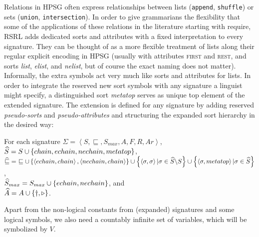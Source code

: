 \documentclass[output=paper
                ,modfonts
                ,nonflat
	        ,collection
	        ,collectionchapter
	        ,collectiontoclongg
 	        ,biblatex
                ,babelshorthands
                ,newtxmath
                ,draftmode
                ,colorlinks, citecolor=brown
]{./langsci/langscibook}
\begin{document}
{{Relations in HPSG often express relationships between
lists (\texttt{append}, \texttt{shuffle}) or sets (\texttt{union},
\texttt{intersection}). In order to give grammarians the flexibility
that some of the applications of these relations in the literature
starting with \citet{PollardSag1994} require, RSRL adds
dedicated sorts and attributes with a fixed interpretation to every signature.
They can be thought of as a more flexible treatment of lists along their
regular explicit encoding in HPSG (usually with attributes \textsc{first} and
\textsc{rest}, and sorts \textit{list}, \textit{elist}, and
\textit{nelist}, but of course the exact naming does not matter).
Informally, the extra symbols act very much like sorts and attributes for
lists. In order to integrate the reserved new sort symbols with any
signature a linguist might specify, a distinguished sort \textit{metatop} serves as unique
top element of the extended signature. The extension is defined for
any signature by adding reserved \emph{pseudo-sorts} and \emph{pseudo-attributes}
and structuring the expanded sort hierarchy in the desired way:

\begin{mydef}\label{def-sig-chains}
For each signature $\Sigma=\left<S,\sqsubseteq,S_{max},A,F,R,Ar\right>$,\\
$\widehat{S}= S \cup \left\{\mit{chain, echain, nechain, metatop}\right\}$,\\
$\Aug\sqsubseteq=\ \sqsubseteq\cup\left\{\left<\mathit{echain},\mathit{chain}\right>,\left<\mathit{nechain},\mathit{chain}\right>\right\}\cup\left\{\left<\sigma,\sigma\right>|\sigma\in\Aug{S}\backslash S\right\}\cup\left\{\left<\sigma,\mathit{metatop}\right>|\sigma\in\Aug{S}\right\}$,\\
$\widehat{S}_{max}=S_{max}\cup\left\{\mit{echain},\mit{nechain}\right\}$, and\\
$\widehat{A}=A\cup\left\{\dagger,\triangleright\right\}$.
\end{mydef}

Apart from the non-logical constants from (expanded) signatures and
some logical symbols, we also need a countably infinite set of
variables, which will be symbolized by $V$.


}}
\end{document}
